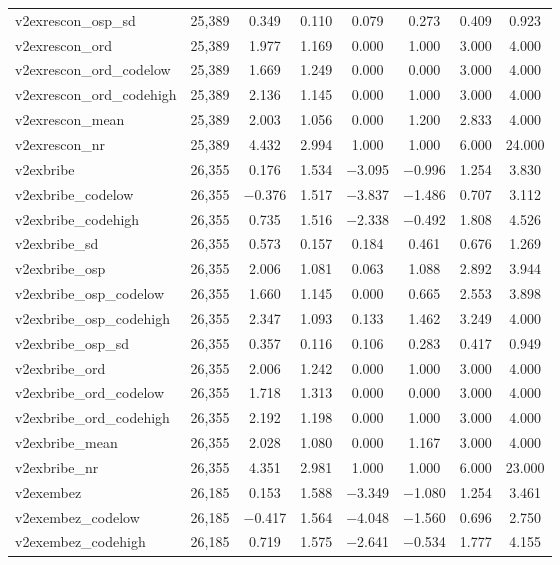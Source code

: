 \begin{table}[!htbp]
\begin{tabular}{@{\extracolsep{5pt}}lccccccc}
v2exrescon\_osp\_sd & 25,389 & 0.349 & 0.110 & 0.079 & 0.273 & 0.409 & 0.923 \\ 
v2exrescon\_ord & 25,389 & 1.977 & 1.169 & 0.000 & 1.000 & 3.000 & 4.000 \\ 
v2exrescon\_ord\_codelow & 25,389 & 1.669 & 1.249 & 0.000 & 0.000 & 3.000 & 4.000 \\ 
v2exrescon\_ord\_codehigh & 25,389 & 2.136 & 1.145 & 0.000 & 1.000 & 3.000 & 4.000 \\ 
v2exrescon\_mean & 25,389 & 2.003 & 1.056 & 0.000 & 1.200 & 2.833 & 4.000 \\ 
v2exrescon\_nr & 25,389 & 4.432 & 2.994 & 1.000 & 1.000 & 6.000 & 24.000 \\ 
v2exbribe & 26,355 & 0.176 & 1.534 & $-$3.095 & $-$0.996 & 1.254 & 3.830 \\ 
v2exbribe\_codelow & 26,355 & $-$0.376 & 1.517 & $-$3.837 & $-$1.486 & 0.707 & 3.112 \\ 
v2exbribe\_codehigh & 26,355 & 0.735 & 1.516 & $-$2.338 & $-$0.492 & 1.808 & 4.526 \\ 
v2exbribe\_sd & 26,355 & 0.573 & 0.157 & 0.184 & 0.461 & 0.676 & 1.269 \\ 
v2exbribe\_osp & 26,355 & 2.006 & 1.081 & 0.063 & 1.088 & 2.892 & 3.944 \\ 
v2exbribe\_osp\_codelow & 26,355 & 1.660 & 1.145 & 0.000 & 0.665 & 2.553 & 3.898 \\ 
v2exbribe\_osp\_codehigh & 26,355 & 2.347 & 1.093 & 0.133 & 1.462 & 3.249 & 4.000 \\ 
v2exbribe\_osp\_sd & 26,355 & 0.357 & 0.116 & 0.106 & 0.283 & 0.417 & 0.949 \\ 
v2exbribe\_ord & 26,355 & 2.006 & 1.242 & 0.000 & 1.000 & 3.000 & 4.000 \\ 
v2exbribe\_ord\_codelow & 26,355 & 1.718 & 1.313 & 0.000 & 0.000 & 3.000 & 4.000 \\ 
v2exbribe\_ord\_codehigh & 26,355 & 2.192 & 1.198 & 0.000 & 1.000 & 3.000 & 4.000 \\ 
v2exbribe\_mean & 26,355 & 2.028 & 1.080 & 0.000 & 1.167 & 3.000 & 4.000 \\ 
v2exbribe\_nr & 26,355 & 4.351 & 2.981 & 1.000 & 1.000 & 6.000 & 23.000 \\ 
v2exembez & 26,185 & 0.153 & 1.588 & $-$3.349 & $-$1.080 & 1.254 & 3.461 \\ 
v2exembez\_codelow & 26,185 & $-$0.417 & 1.564 & $-$4.048 & $-$1.560 & 0.696 & 2.750 \\ 
v2exembez\_codehigh & 26,185 & 0.719 & 1.575 & $-$2.641 & $-$0.534 & 1.777 & 4.155 \\ 

\end{tabular}
\end{table}
